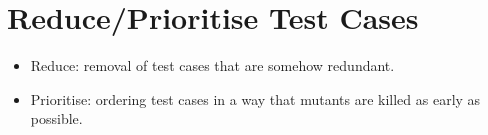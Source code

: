 
\section{Reduce/Prioritise Test Cases}

\label{sec:reduceprioritise}

\begin{itemize}
	\item Reduce: removal of test cases that are somehow redundant.
	\item Prioritise: ordering test cases in a way that mutants are killed as early as possible.
\end{itemize}

